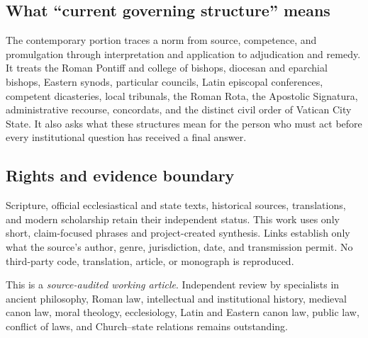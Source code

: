 {\subsection{What ``current governing structure'' means}

The contemporary portion traces a norm from source, competence, and promulgation through interpretation and application to adjudication and remedy. It treats the Roman Pontiff and college of bishops, diocesan and eparchial bishops, Eastern synods, particular councils, Latin episcopal conferences, competent dicasteries, local tribunals, the Roman Rota, the Apostolic Signatura, administrative recourse, concordats, and the distinct civil order of Vatican City State. It also asks what these structures mean for the person who must act before every institutional question has received a final answer.

\subsection{Rights and evidence boundary}

Scripture, official ecclesiastical and state texts, historical sources, translations, and modern scholarship retain their independent status. This work uses only short, claim-focused phrases and project-created synthesis. Links establish only what the source's author, genre, jurisdiction, date, and transmission permit. No third-party code, translation, article, or monograph is reproduced.

This is a \emph{source-audited working article}. Independent review by specialists in ancient philosophy, Roman law, intellectual and institutional history, medieval canon law, moral theology, ecclesiology, Latin and Eastern canon law, public law, conflict of laws, and Church--state relations remains outstanding.
}
